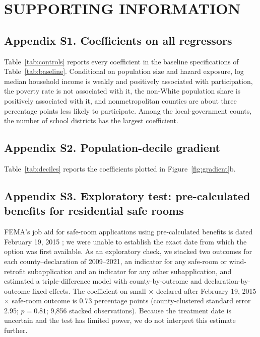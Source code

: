 \setcounter{table}{0}
\setcounter{figure}{0}
\renewcommand{\thetable}{S\arabic{table}}
\renewcommand{\thefigure}{S\arabic{figure}}
\section*{SUPPORTING INFORMATION}

\subsection*{Appendix S1. Coefficients on all regressors}

Table~\ref{tab:controls} reports every coefficient in the baseline specifications of Table~\ref{tab:baseline}. Conditional on population size and hazard exposure, log median household income is weakly and positively associated with participation, the poverty rate is not associated with it, the non-White population share is positively associated with it, and nonmetropolitan counties are about three percentage points less likely to participate. Among the local-government counts, the number of school districts has the largest coefficient.



\subsection*{Appendix S2. Population-decile gradient}

Table~\ref{tab:deciles} reports the coefficients plotted in Figure~\ref{fig:gradient}b.



\subsection*{Appendix S3. Exploratory test: pre-calculated benefits for residential safe rooms}

FEMA's job aid for safe-room applications using pre-calculated benefits is dated February 19, 2015 \parencite{fema2015saferoomprecalc}; we were unable to establish the exact date from which the option was first available. As an exploratory check, we stacked two outcomes for each county--declaration of 2009--2021, an indicator for any safe-room or wind-retrofit subapplication and an indicator for any other subapplication, and estimated a triple-difference model with county-by-outcome and declaration-by-outcome fixed effects. The coefficient on small $\times$ declared after February 19, 2015 $\times$ safe-room outcome is 0.73 percentage points (county-clustered standard error 2.95; $p = 0.81$; 9,856 stacked observations). Because the treatment date is uncertain and the test has limited power, we do not interpret this estimate further.

